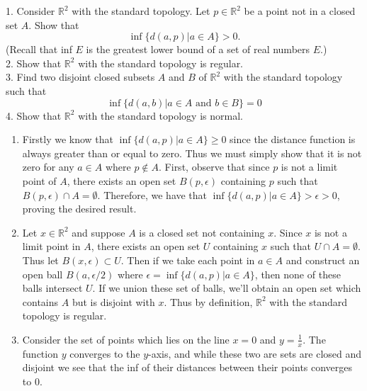 \documentclass[a4paper,12pt,twoside]{hmcpset}
\begin{document}
\begin{exercise}[Exercise 5.6]
    1. Consider $\mathbb{R}^2$ with the standard topology. Let $p \in
\mathbb{R}^2$ be a point not in a closed set $A$. Show that 
$$
\inf\{d(a, p) | a \in A\} > 0.
$$
(Recall that inf $E$ is the greatest lower bound of a set of real
numbers $E$.)\\
2. Show that $\mathbb{R}^2$ with the standard topology is regular. \\
3. Find two disjoint closed subsets $A$ and $B$ of $\mathbb{R}^2$ with
the standard topology such that 
$$
\inf\{d(a, b) | a \in A \text{ and } b \in B\} = 0
$$
4. Show that $\mathbb{R}^2$ with the standard topology is normal.
\end{exercise}

\begin{solution}
    \begin{enumerate}
        \item Firstly we know that $\inf\{d(a, p) | a \in A\} \ge 0$ since the
        distance function is always greater than or equal to zero. Thus we
        must simply show that it is not zero for any $a \in A$ where $p \notin
        A$. First, observe that since $p$ is not a limit point of $A$, there
        exists an open set $B(p, \epsilon)$ containing $p$ such that $B(p,
        \epsilon) \cap A = \emptyset$. Therefore, we have that $\inf\{d(a, p)
        | a \in A\} > \epsilon > 0$, proving the desired result. 
    
        \item Let $x \in \mathbb{R}^2$ and suppose $A$ is a closed set not
        containing $x$. Since $x$ is not a limit point in $A$, there exists an
        open set $U$ containing $x$ such that $U \cap A = \emptyset$. Thus let
        $B(x, \epsilon) \subset U$. Then if we take each point in $a \in A$
        and construct an open ball $B(a, \epsilon/2)$ where $\epsilon =
        \inf\{d(a, p) | a \in A\}$, then none of these balls intersect $U$. If
        we union these set of balls, we'll obtain an open set which contains
        $A$ but is disjoint with $x$. Thus by definition, $\mathbb{R}^2$ with
        the standard topology is regular. 
        
        \item Consider the set of points which lies on the line $x = 0$ and $y =
        \frac{1}{x}$. The function $y$ converges to the $y$-axis, and while
        these two are sets are closed and disjoint we see that the inf of
        their distances between their points converges to 0.
        

\end{enumerate}
\end{solution}
\end{document}
